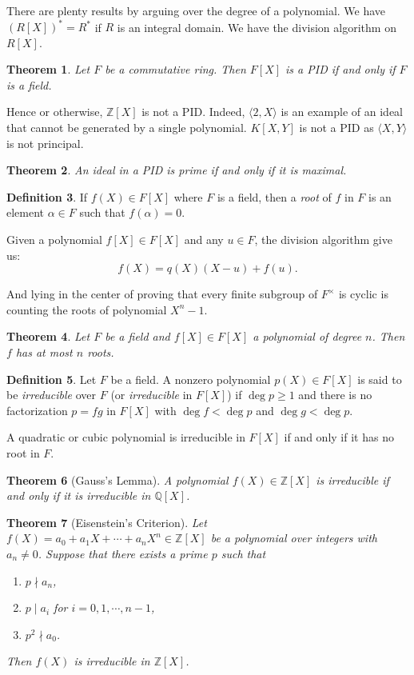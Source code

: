 \documentclass[12pt]{report}
\newtheorem{thm}{Theorem}[section]
\theoremstyle{definition}
\newtheorem{defn}[thm]{Definition}
\def\ZZ{\mathbb{Z}}
\def\QQ{\mathbb{Q}}
\begin{document}
There are plenty results by arguing over the degree of a polynomial. We have $(R[X])^* =  R^*$ if $R$ is an integral domain. We have the division algorithm on $R[X]$.

\begin{thm}
Let $F$ be a commutative ring. Then $F[X]$ is a PID if and only if $F$ is a field.
\end{thm}

Hence or otherwise, $\ZZ[X]$ is not a PID. Indeed, $\langle 2, X\rangle$ is an example of an ideal that cannot be generated by a single polynomial. $K[X,Y]$ is not a PID as $\langle X, Y \rangle$ is not principal.

\begin{thm}
    An ideal in a PID is prime if and only if it is maximal.
\end{thm}

\smallskip

\begin{defn}
    If $f(X)\in F[X]$ where $F$ is a field, then a \emph{root} of $f$ in $F$ is an element $\alpha\in F$ such that $f(\alpha)=0$.
\end{defn}

Given a polynomial $f[X]\in F[X]$ and any $u\in F$, the division algorithm give us: $$f(X)= q(X)(X-u)+f(u).$$

And lying in the center of proving that every finite subgroup of $F^\times$ is cyclic is counting the roots of polynomial $X^n-1$.

\begin{thm}
    Let $F$ be a field and $f[X]\in F[X]$ a polynomial of degree $n$. Then $f$ has at most $n$ roots.
\end{thm}

\begin{defn}
    Let $F$ be a field. A nonzero polynomial $p(X) \in F[X]$ is said to be \emph{irreducible} over $F$ (or \emph{irreducible} in $F[X]$) if $\deg p \geq 1$ and there is no factorization $p=fg$ in $F[X]$ with $\deg f < \deg p$ and $\deg g < \deg p$.
\end{defn}

A quadratic or cubic polynomial is irreducible in $F[X]$ if and only if it has no root in $F$.

\begin{thm}[Gauss's Lemma]
    A polynomial $f(X)\in \ZZ[X]$ is irreducible if and only if it is irreducible in $\QQ[X]$.
\end{thm}

\begin{thm}[Eisenstein's Criterion]
    Let $f(X) = a_0+a_1X+\cdots+a_nX^n\in \ZZ[X]$ be a polynomial over integers with $a_n\not= 0$. Suppose that there exists a prime $p$ such that \begin{enumerate}
        \item  $p\nmid a_n$, 
        \item  $p\mid a_i$  for  $i=0,1,\cdots,n-1$,
        \item  $p^2\nmid a_0$.
    \end{enumerate}
    Then $f(X)$ is irreducible in $\ZZ[X]$.
\end{thm}
\end{document}
